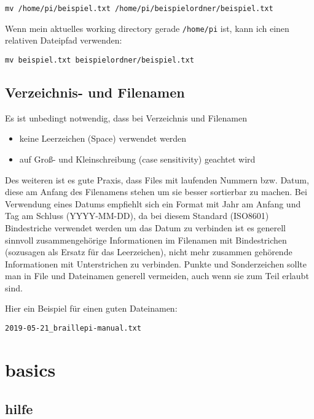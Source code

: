 \documentclass[]{book}
\providecommand{\tightlist}{%
  \setlength{\itemsep}{0pt}\setlength{\parskip}{0pt}}
\begin{document}
\begin{verbatim}
mv /home/pi/beispiel.txt /home/pi/beispielordner/beispiel.txt
\end{verbatim}

Wenn mein aktuelles working directory gerade \texttt{/home/pi} ist, kann ich einen relativen Dateipfad verwenden:

\begin{verbatim}
mv beispiel.txt beispielordner/beispiel.txt
\end{verbatim}

\hypertarget{verzeichnis--und-filenamen}{%
\section{Verzeichnis- und Filenamen}\label{verzeichnis--und-filenamen}}

Es ist unbedingt notwendig, dass bei Verzeichnis und Filenamen

\begin{itemize}
\tightlist
\item
  keine Leerzeichen (Space) verwendet werden
\item
  auf Groß- und Kleinschreibung (case sensitivity) geachtet wird
\end{itemize}

Des weiteren ist es gute Praxis, dass Files mit laufenden Nummern bzw. Datum, diese am Anfang des Filenamens stehen um sie besser sortierbar zu machen. Bei Verwendung eines Datums empfiehlt sich ein Format mit Jahr am Anfang und Tag am Schluss (YYYY-MM-DD), da bei diesem Standard (ISO8601) Bindestriche verwendet werden um das Datum zu verbinden ist es generell sinnvoll zusammengehörige Informationen im Filenamen mit Bindestrichen (sozusagen als Ersatz für das Leerzeichen), nicht mehr zusammen gehörende Informationen mit Unterstrichen zu verbinden.
Punkte und Sonderzeichen sollte man in File und Dateinamen generell vermeiden, auch wenn sie zum Teil erlaubt sind.

Hier ein Beispiel für einen guten Dateinamen:

\begin{verbatim}
2019-05-21_braillepi-manual.txt
\end{verbatim}

\hypertarget{basics}{%
\chapter{basics}\label{basics}}

\hypertarget{hilfe}{%
\section{hilfe}\label{hilfe}}
\end{document}
